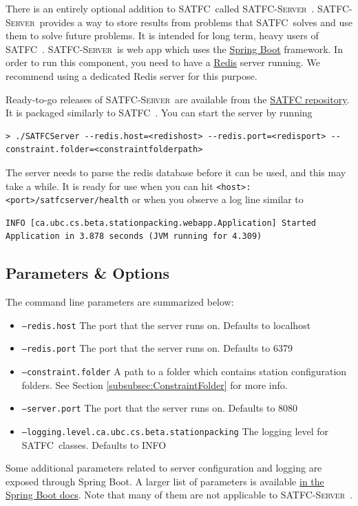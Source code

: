 \documentclass[
10pt, %
letterpaper, %
oneside, %
headinclude,footinclude, %
BCOR5mm, %
needspace, %
]{scrartcl}
\newcommand{\SATFC}{\textsc{SATFC}~}
\newcommand{\SATFCServer}{\textsc{SATFC-Server}~}
\begin{document}
There is an entirely optional addition to \SATFC called \SATFCServer. \SATFCServer provides a way to store results from problems that \SATFC solves and use them to solve future problems. It is intended for long term, heavy users of \SATFC. \SATFCServer is web app which uses the \href{http://projects.spring.io/spring-boot/}{Spring Boot} framework. In order to run this component, you need to have a \href{http://redis.io/}{Redis} server running. We recommend using a dedicated Redis server for this purpose.

Ready-to-go releases of \SATFCServer are available from the \href{https://github.com/FCC/SATFC/releases}{SATFC  repository}. It is packaged similarly to \SATFC. You can start the server by running
\begin{lstlisting}[style=Bash]
> ./SATFCServer --redis.host=<redishost> --redis.port=<redisport> --constraint.folder=<constraintfolderpath>
\end{lstlisting}
The server needs to parse the redis database before it can be used, and this may take a while. It is ready for use when you can hit \texttt{<host>:<port>/satfcserver/health} or when you observe a log line similar to 
\begin{lstlisting}[style=Bash]
INFO [ca.ubc.cs.beta.stationpacking.webapp.Application] Started Application in 3.878 seconds (JVM running for 4.309)
\end{lstlisting}

\subsection{Parameters \& Options}

The command line parameters are summarized below:
\begin{itemize}
\item \texttt{---redis.host} The port that the server runs on. Defaults to localhost
\item \texttt{---redis.port} The port that the server runs on. Defaults to 6379
\item \texttt{---constraint.folder} A path to a folder which contains station configuration folders. See Section \ref{subsubsec:ConstraintFolder} for more info.
\item \texttt{---server.port} The port that the server runs on. Defaults to 8080
\item \texttt{---logging.level.ca.ubc.cs.beta.stationpacking} The logging level for \SATFC classes. Defaults to INFO
\end{itemize}
Some additional parameters related to server configuration and logging are exposed through Spring Boot. A larger list of parameters is available \href{http://docs.spring.io/spring-boot/docs/current/reference/html/common-application-properties.html}{in the Spring Boot docs}. Note that many of them are not applicable to \SATFCServer. 
\end{document}
